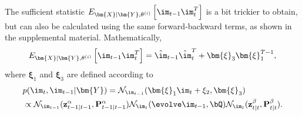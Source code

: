 The sufficient statistic $E_{ \bm{X}| \bm{Y}, \theta^{(i)} } \left[ \im_{t-1} \im_t^T \right]$ is a bit trickier to obtain, but can also be calculated using the same forward-backward terms, as shown in the supplemental material. Mathematically,	
\begin{align}
E_{ \bm{X}| \bm{Y}, \theta^{(i)} } \left[ \im_{t-1} \im_t^T \right] = \hat{\im}_{t-1} \hat{\im}_t^T  + \bm{\xi}_3 \bm{\xi}_1^{T -1}, 
\end{align}	
where $\bm{\xi}_1$ and $\bm{\xi}_3$ are defined according to
    \begin{align}
    & p(\im_t, \im_{t-1}|\bm{Y})  = \mathcal{N}_{\im_{t-1}}(\bm{\xi}_1\im_t + \xi_2, \bm{\xi}_3) \\
    \notag & \propto \mathcal{N}_{\im_{t-1}} ({\bf z}^{\alpha}_{t-1|t-1}, {\bf P}^{\alpha}_{t-1|t-1} ) \mathcal{N}_{\im_t} ( \evolve \im_{t-1}, \bQ )  \mathcal{N}_{\im_{t}} ({\bf z}^{\beta}_{t|t}, {\bf P}^{\beta}_{t|t} ).
    \end{align}
	
	
	
	
	
	
	
	
